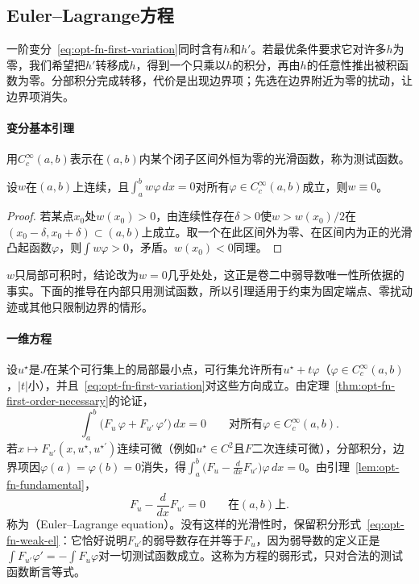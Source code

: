 \subsection{Euler--Lagrange方程}
\label{sec:opt-fn-euler-lagrange}

一阶变分~\eqref{eq:opt-fn-first-variation}同时含有$h$和$h'$。若最优条件要求它对许多$h$为零，我们希望把$h'$转移成$h$，得到一个只乘以$h$的积分，再由$h$的任意性推出被积函数为零。分部积分完成转移，代价是出现边界项；先选在边界附近为零的扰动，让边界项消失。

\paragraph{变分基本引理}
用$C_c^\infty(a,b)$表示在$(a,b)$内某个闭子区间外恒为零的光滑函数，称为测试函数。

\begin{lemma}[变分基本引理]
\label{lem:opt-fn-fundamental}
设$w$在$(a,b)$上连续，且$\int_a^bw\varphi\,dx=0$对所有$\varphi\in C_c^\infty(a,b)$成立，则$w\equiv0$。
\end{lemma}

\begin{proof}
若某点$x_0$处$w(x_0)>0$，由连续性存在$\delta>0$使$w>w(x_0)/2$在$(x_0-\delta,x_0+\delta)\subset(a,b)$上成立。取一个在此区间外为零、在区间内为正的光滑凸起函数$\varphi$，则$\int w\varphi>0$，矛盾。$w(x_0)<0$同理。
\end{proof}

$w$只局部可积时，结论改为$w=0$几乎处处，这正是卷二中弱导数唯一性所依据的事实。下面的推导在内部只用测试函数，所以引理适用于约束为固定端点、零扰动迹或其他只限制边界的情形。

\paragraph{一维方程}
设$u^\star$是$J$在某个可行集上的局部最小点，可行集允许所有$u^\star+t\varphi$（$\varphi\in C_c^\infty(a,b)$，$|t|$小），并且~\eqref{eq:opt-fn-first-variation}对这些方向成立。由定理~\ref{thm:opt-fn-first-order-necessary}的论证，
\begin{equation}
 \int_a^b\bigl(F_u\,\varphi+F_{u'}\,\varphi'\bigr)\,dx=0\qquad\text{对所有}\varphi\in C_c^\infty(a,b) .
 \label{eq:opt-fn-weak-el}
\end{equation}
若$x\mapsto F_{u'}(x,u^\star,u^{\star\prime})$连续可微（例如$u^\star\in C^2$且$F$二次连续可微），分部积分，边界项因$\varphi(a)=\varphi(b)=0$消失，得$\int_a^b\bigl(F_u-\frac{d}{dx}F_{u'}\bigr)\varphi\,dx=0$。由引理~\ref{lem:opt-fn-fundamental}，
\begin{equation}
 F_u-\frac{d}{dx}F_{u'}=0\qquad\text{在}(a,b)\text{上} .
 \label{eq:opt-fn-el}
\end{equation}
称为（Euler--Lagrange equation）。没有这样的光滑性时，保留积分形式~\eqref{eq:opt-fn-weak-el}：它恰好说明$F_{u'}$的弱导数存在并等于$F_u$，因为弱导数的定义正是$\int F_{u'}\varphi'=-\int F_u\varphi$对一切测试函数成立。这称为方程的弱形式，只对合法的测试函数断言等式。

